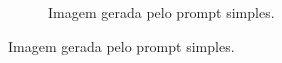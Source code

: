 \begin{figure}[htbp]
\begin{subfigure}{0.45\linewidth}
        \caption{\small Imagem gerada pelo prompt simples.}
        \label{fig:cgDream9d}
    \end{subfigure}


\end{figure}